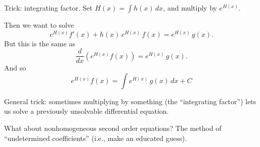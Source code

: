 \documentclass[12pt]{article}
\begin{document}
Trick: integrating factor.  Set $H(x) = \int h(x) \, dx$, and multiply
by $e^{H(x)}$.

Then we want to solve
$$
e^{H(x)} f'(x) + h(x) \, e^{H(x)} \, f(x) = e^{H(x)} \, g(x).
$$
But this is the same as
$$
\frac{d}{dx} \left( e^{H(x)} f(x) \right) = e^{H(x)} \, g(x).
$$
And so
$$
e^{H(x)} f(x) = \int e^{H(x)} \, g(x) \, dx + C
$$

General trick: sometimes multiplying by something (the ``integrating
factor'') lets us solve a previously unsolvable differential equation.

What about nonhomogeneous second order equations?  The method of
``undetermined coefficients'' (i.e., make an educated guess).
\end{document}
